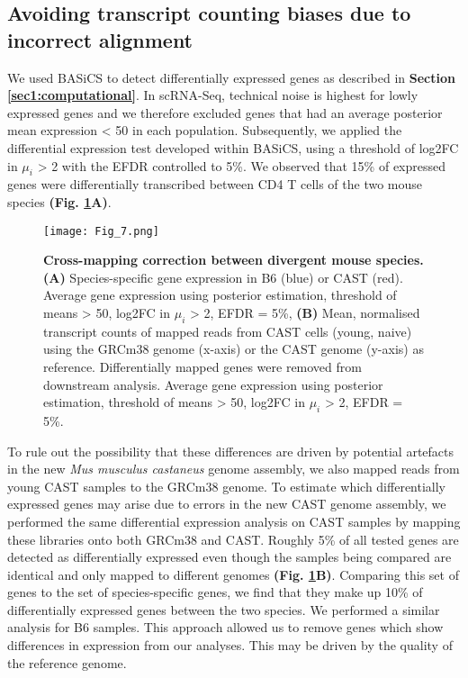 \subsection{Avoiding transcript counting biases due to incorrect alignment}

We used BASiCS \citep{Vallejos2016} to detect differentially expressed genes as described in \textbf{Section \ref{sec1:computational}}. 
In scRNA-Seq, technical noise is highest for lowly expressed genes \citep{Brennecke2013} and we therefore excluded genes that had an average posterior mean expression < 50 in each population. 
Subsequently, we applied the differential expression test developed within BASiCS, using a threshold of log2FC in $\mu_i$ > 2 with the EFDR controlled to 5\%. 
We observed that 15\% of expressed genes were differentially transcribed between CD4\plus{} T cells of the two mouse species \textbf{(Fig. \ref{fig1:spec_spec_mapping}A)}. 

\begin{figure}[!hb]
\centering
\texttt{[image: Fig\_7.png]}
\caption[Cross-mapping correction between divergent mouse species]{\textbf{Cross-mapping correction between divergent mouse species.}\\
\textbf{(A)} Species-specific gene expression in B6 (blue) or CAST (red). Average gene expression using posterior estimation, threshold of means > 50, log2FC in $\mu_i$ > 2, EFDR = 5\%, 
\textbf{(B)} Mean, normalised transcript counts of mapped reads from CAST cells (young, naive) using the GRCm38 genome (x-axis) or the CAST genome (y-axis) as reference. 
Differentially mapped genes were removed from downstream analysis. 
Average gene expression using posterior estimation, threshold of means > 50, log2FC in $\mu_i$ > 2, EFDR = 5\%.
}
\label{fig1:spec_spec_mapping}
\end{figure}

To rule out the possibility that these differences are driven by potential artefacts in the new \textit{Mus musculus castaneus} genome assembly, we also mapped reads from young CAST samples to the GRCm38 genome. 
To estimate which differentially expressed genes may arise due to errors in the new CAST genome assembly, we performed the same differential expression analysis on CAST samples by mapping these libraries onto both GRCm38 and CAST. 
Roughly 5\% of all tested genes are detected as differentially expressed even though the samples being compared are identical and only mapped to different genomes \textbf{(Fig. \ref{fig1:spec_spec_mapping}B)}. 
Comparing this set of genes to the set of species-specific genes, we find that they make up 10\% of differentially expressed genes between the two species. 
We performed a similar analysis for B6 samples. 
This approach allowed us to remove genes which show differences in expression from our analyses. 
This may be driven by the quality of the reference genome.

